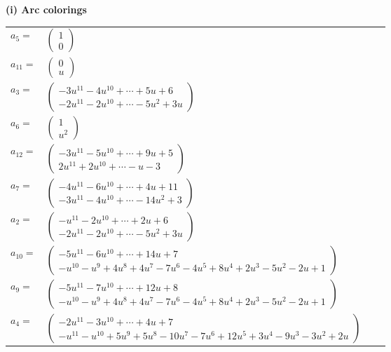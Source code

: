 \documentclass[1p]{elsarticle_modified}
\theoremstyle{definition}
\begin{document}
\flushleft \textbf{(i) Arc colorings}\\
\begin{tabular}{m{7pt} m{180pt} m{7pt} m{180pt} }
\flushright $a_{5}=$&$\begin{pmatrix}1\\0\end{pmatrix}$ \\
\flushright $a_{11}=$&$\begin{pmatrix}0\\u\end{pmatrix}$ \\
\flushright $a_{3}=$&$\begin{pmatrix}-3 u^{11}-4 u^{10}+\cdots+5 u+6\\-2 u^{11}-2 u^{10}+\cdots-5 u^2+3 u\end{pmatrix}$ \\
\flushright $a_{6}=$&$\begin{pmatrix}1\\u^2\end{pmatrix}$ \\
\flushright $a_{12}=$&$\begin{pmatrix}-3 u^{11}-5 u^{10}+\cdots+9 u+5\\2 u^{11}+2 u^{10}+\cdots- u-3\end{pmatrix}$ \\
\flushright $a_{7}=$&$\begin{pmatrix}-4 u^{11}-6 u^{10}+\cdots+4 u+11\\-3 u^{11}-4 u^{10}+\cdots-14 u^2+3\end{pmatrix}$ \\
\flushright $a_{2}=$&$\begin{pmatrix}- u^{11}-2 u^{10}+\cdots+2 u+6\\-2 u^{11}-2 u^{10}+\cdots-5 u^2+3 u\end{pmatrix}$ \\
\flushright $a_{10}=$&$\begin{pmatrix}-5 u^{11}-6 u^{10}+\cdots+14 u+7\\- u^{10}- u^9+4 u^8+4 u^7-7 u^6-4 u^5+8 u^4+2 u^3-5 u^2-2 u+1\end{pmatrix}$ \\
\flushright $a_{9}=$&$\begin{pmatrix}-5 u^{11}-7 u^{10}+\cdots+12 u+8\\- u^{10}- u^9+4 u^8+4 u^7-7 u^6-4 u^5+8 u^4+2 u^3-5 u^2-2 u+1\end{pmatrix}$ \\
\flushright $a_{4}=$&$\begin{pmatrix}-2 u^{11}-3 u^{10}+\cdots+4 u+7\\- u^{11}- u^{10}+5 u^9+5 u^8-10 u^7-7 u^6+12 u^5+3 u^4-9 u^3-3 u^2+2 u\end{pmatrix}$ \\

\end{tabular}
\end{document}
